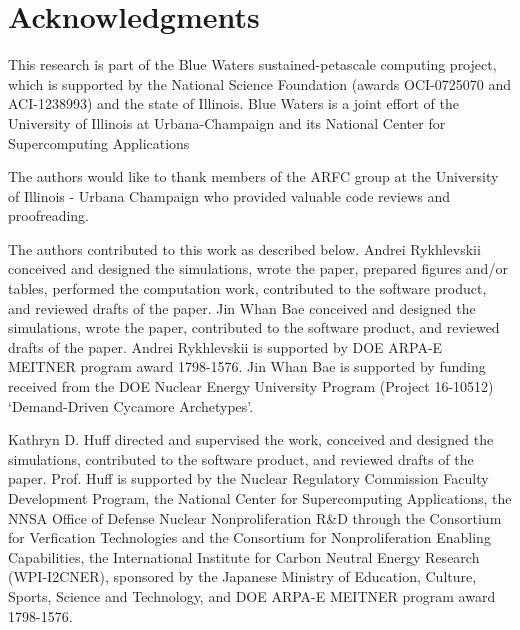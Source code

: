 \section{Acknowledgments}

This research is part of the Blue Waters sustained-petascale computing project, 
which is supported by the National Science Foundation (awards OCI-0725070 and 
ACI-1238993) and the state of Illinois. Blue Waters is a joint effort of the 
University of Illinois at Urbana-Champaign and its National Center for 
Supercomputing Applications 

The authors would like to thank  members of the \gls{ARFC} group at the 
University of Illinois - Urbana Champaign who provided valuable code reviews 
and proofreading.

The authors contributed to this work as described below.  Andrei Rykhlevskii 
conceived and designed the simulations, wrote the paper, prepared figures 
and/or tables, performed the computation work, contributed to the software 
product, and reviewed drafts of the paper. Jin Whan Bae conceived and designed 
the simulations, wrote the paper, contributed to the software 
product, and reviewed drafts of the paper. Andrei Rykhlevskii 
is supported by 
DOE ARPA-E MEITNER program award 1798-1576. 
Jin Whan
Bae is supported by funding received from the DOE Nuclear Energy University
Program (Project 16-10512) `Demand-Driven Cycamore Archetypes'.

Kathryn D. Huff directed and 
supervised the work, conceived and designed the simulations, 
contributed to the software product, and reviewed drafts of the paper.  Prof. 
Huff is supported by the Nuclear Regulatory Commission Faculty Development 
Program, the National Center for Supercomputing Applications, the NNSA Office 
of Defense Nuclear Nonproliferation R\&D through the Consortium for Verfication 
Technologies and the Consortium for Nonproliferation Enabling Capabilities,  
the International Institute for Carbon Neutral Energy Research (WPI-I2CNER), 
sponsored by the Japanese Ministry of Education, Culture, Sports, Science and 
Technology, and DOE ARPA-E MEITNER program award 1798-1576. 

